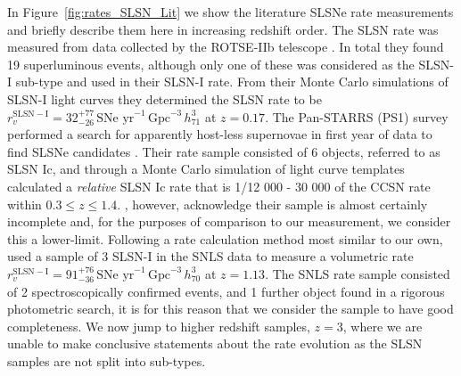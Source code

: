 \documentclass[a4paper,fleqn,usenatbib]{mnras}
\begin{document}
In Figure~\ref{fig:rates_SLSN_Lit} we show the literature SLSNe rate measurements and briefly describe them here in increasing redshift order. The \citet{Quimby2013} SLSN rate was measured from data collected by the ROTSE-IIb telescope \citep{2003PASP..115..132A}. In total they found 19 superluminous events, although only one of these was considered as the SLSN-I sub-type and used in their SLSN-I rate. From their Monte Carlo simulations of SLSN-I light curves they determined the SLSN rate to be $r^\mathrm{SLSN-I}_v=32_{-26}^{+77}\, \text{SNe yr}^{-1}\, \text{Gpc}^{-3}\, h_{71}^{3}$ at $z=0.17$. The Pan-STARRS (PS1) \citep{Pan-STARRS_REF} survey performed a search for apparently host-less supernovae in first year of data to find SLSNe candidates \citep{McCrum2015}. Their rate sample consisted of 6 objects, referred to as SLSN Ic, and through a Monte Carlo simulation of light curve templates calculated a \textit{relative} SLSN Ic rate that is 1/12 000 - 30 000 of the CCSN rate within $0.3\le z\le 1.4$. \citet{McCrum2015}, however, acknowledge their sample is almost certainly incomplete and, for the purposes of comparison to our measurement, we consider this a lower-limit. Following a rate calculation method most similar to our own, \citet{Prajs2016} used a sample of 3 SLSN-I in the SNLS data to measure a volumetric rate  $r^\mathrm{SLSN-I}_v=91_{-36}^{+76}\, \text{SNe yr}^{-1}\, \text{Gpc}^{-3}\, h_{70}^{3}$ at $z=1.13$. The SNLS rate sample consisted of 2 spectroscopically confirmed events, and 1 further object found in a rigorous photometric search, it is for this reason that we consider the \citet{Prajs2016} sample to have good completeness. We now jump to higher redshift samples, $z=3$, where we are unable to make conclusive statements about the rate evolution as  the SLSN samples are not split into sub-types.  

\end{document}
